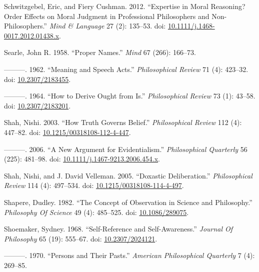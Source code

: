 \documentclass[
  10pt,
  letterpaper,
  DIV=11,
  numbers=noendperiod,
  twoside]{scrartcl}
\newlength{\cslhangindent}
\newenvironment{CSLReferences}[2] %
 {\begin{list}{}{%
  \setlength{\itemindent}{0pt}
  \setlength{\leftmargin}{0pt}
  \setlength{\parsep}{0pt}
  \ifodd #1
   \setlength{\leftmargin}{\cslhangindent}
   \setlength{\itemindent}{-1\cslhangindent}
  \fi
  \setlength{\itemsep}{#2\baselineskip}}}
 {\end{list}}
\begin{document}
\begin{CSLReferences}{1}{0}
Schwitzgebel, Eric, and Fiery Cushman. 2012. {``Expertise in Moral
Reasoning? Order Effects on Moral Judgment in Professional Philosophers
and Non-Philosophers.''} \emph{Mind \& Language} 27 (2): 135--53. doi:
\href{https://doi.org/10.1111/j.1468-0017.2012.01438.x}{10.1111/j.1468-0017.2012.01438.x}.

Searle, John R. 1958. {``Proper Names.''} \emph{Mind} 67 (266): 166--73.

---------. 1962. {``Meaning and Speech Acts.''} \emph{Philosophical
Review} 71 (4): 423--32. doi:
\href{https://doi.org/10.2307/2183455}{10.2307/2183455}.

---------. 1964. {``How to Derive Ought from Is.''} \emph{Philosophical
Review} 73 (1): 43--58. doi:
\href{https://doi.org/10.2307/2183201}{10.2307/2183201}.

Shah, Nishi. 2003. {``How Truth Governs Belief.''} \emph{Philosophical
Review} 112 (4): 447--82. doi:
\href{https://doi.org/10.1215/00318108-112-4-447}{10.1215/00318108-112-4-447}.

---------. 2006. {``A New Argument for Evidentialism.''}
\emph{Philosophical Quarterly} 56 (225): 481--98. doi:
\href{https://doi.org/10.1111/j.1467-9213.2006.454.x}{10.1111/j.1467-9213.2006.454.x}.

Shah, Nishi, and J. David Velleman. 2005. {``Doxastic Deliberation.''}
\emph{Philosophical Review} 114 (4): 497--534. doi:
\href{https://doi.org/10.1215/00318108-114-4-497}{10.1215/00318108-114-4-497}.

Shapere, Dudley. 1982. {``The Concept of Observation in Science and
Philosophy.''} \emph{Philosophy Of Science} 49 (4): 485--525. doi:
\href{https://doi.org/10.1086/289075}{10.1086/289075}.

Shoemaker, Sydney. 1968. {``Self-Reference and Self-Awareness.''}
\emph{Journal Of Philosophy} 65 (19): 555--67. doi:
\href{https://doi.org/10.2307/2024121}{10.2307/2024121}.

---------. 1970. {``Persons and Their Pasts.''} \emph{American
Philosophical Quarterly} 7 (4): 269--85.


\end{CSLReferences}
\end{document}
